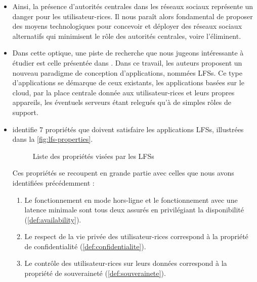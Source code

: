 \begin{itemize}
    \item Ainsi, la présence d'autorités centrales dans les réseaux sociaux représente un danger pour les utilisateur-rices.
      Il nous paraît alors fondamental de proposer des moyens technologiques pour concevoir et déployer des réseaux sociaux alternatifs qui minimisent le rôle des autorités centrales, voire l'éliminent.
    \item Dans cette optique, une piste de recherche que nous jugeons intéressante à étudier est celle présentée dans \cite{localfirstsoftware2019}.
      Dans ce travail, les auteurs proposent un nouveau paradigme de conception d'applications, nommées \acp{LFS}.
      Ce type d'applications se démarque de ceux existants, \eg les applications basées sur le cloud, par la place centrale donnée aux utilisateur-rices et leurs propres appareils, les éventuels serveurs étant relegués qu'à de simples rôles de support.
    \item \cite{localfirstsoftware2019} identifie 7 propriétés que doivent satisfaire les applications \acp{LFS}, illustrées dans la \autoref{fig:lfs-properties}.
      \begin{figure}[!ht]
        \centering
        \caption[Caption for lfs-properties]{Liste des propriétés visées par les \acp{LFS}\footnotemark}
        \label{fig:lfs-properties}
      \end{figure}
      Ces propriétés se recoupent en grande partie avec celles que nous avons identifiées précédemment :
      \begin{enumerate}
        \item Le fonctionnement en mode hors-ligne et le fonctionnement avec une latence minimale sont tous deux assurés en privilégiant la disponibilité \cite{pacelc2012} (\autoref{def:availability}).
        \item Le respect de la vie privée des utilisateur-rices correspond à la propriété de confidentialité (\autoref{def:confidentialite}).
        \item Le contrôle des utilisateur-rices sur leurs données correspond à la propriété de souveraineté (\autoref{def:souverainete}).

\end{enumerate}
\end{itemize}
